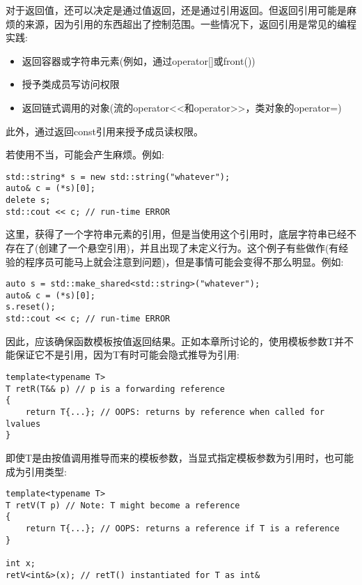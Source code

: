 

对于返回值，还可以决定是通过值返回，还是通过引用返回。但返回引用可能是麻烦的来源，因为引用的东西超出了控制范围。一些情况下，返回引用是常见的编程实践:

\begin{itemize}
\item 
返回容器或字符串元素(例如，通过operator[]或front())

\item 
授予类成员写访问权限

\item 
返回链式调用的对象(流的operator<{}<和operator>{}>，类对象的operator=)
\end{itemize}

此外，通过返回const引用来授予成员读权限。

若使用不当，可能会产生麻烦。例如:

\begin{lstlisting}[style=styleCXX]
std::string* s = new std::string("whatever");
auto& c = (*s)[0];
delete s;
std::cout << c; // run-time ERROR
\end{lstlisting}

这里，获得了一个字符串元素的引用，但是当使用这个引用时，底层字符串已经不存在了(创建了一个悬空引用)，并且出现了未定义行为。这个例子有些做作(有经验的程序员可能马上就会注意到问题)，但是事情可能会变得不那么明显。例如:

\begin{lstlisting}[style=styleCXX]
auto s = std::make_shared<std::string>("whatever");
auto& c = (*s)[0];
s.reset();
std::cout << c; // run-time ERROR
\end{lstlisting}

因此，应该确保函数模板按值返回结果。正如本章所讨论的，使用模板参数T并不能保证它不是引用，因为T有时可能会隐式推导为引用:

\begin{lstlisting}[style=styleCXX]
template<typename T>
T retR(T&& p) // p is a forwarding reference
{
	return T{...}; // OOPS: returns by reference when called for lvalues
}
\end{lstlisting}

即使T是由按值调用推导而来的模板参数，当显式指定模板参数为引用时，也可能成为引用类型:

\begin{lstlisting}[style=styleCXX]
template<typename T>
T retV(T p) // Note: T might become a reference
{
	return T{...}; // OOPS: returns a reference if T is a reference
}

int x;
retV<int&>(x); // retT() instantiated for T as int&
\end{lstlisting}

